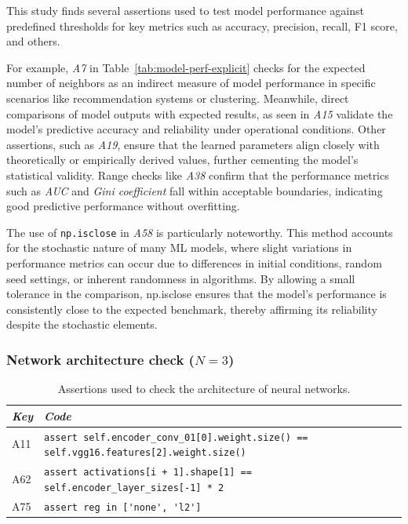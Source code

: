 This study finds several assertions used to test model performance against predefined thresholds for key metrics such as accuracy, precision, recall, F1 score, and others.

For example, \emph{A7} in Table~\ref{tab:model-perf-explicit} checks for the expected number of neighbors as an indirect measure of model performance in specific scenarios like recommendation systems or clustering. Meanwhile, direct comparisons of model outputs with expected results, as seen in \emph{A15} validate the model's predictive accuracy and reliability under operational conditions. Other assertions, such as \emph{A19}, ensure that the learned parameters align closely with theoretically or empirically derived values, further cementing the model’s statistical validity. Range checks like \emph{A38} confirm that the performance metrics such as \emph{AUC} and \emph{Gini coefficient} fall within acceptable boundaries, indicating good predictive performance without overfitting.

The use of \texttt{np.isclose} in \emph{A58} is particularly noteworthy. This method accounts for the stochastic nature of many ML models, where slight variations in performance metrics can occur due to differences in initial conditions, random seed settings, or inherent randomness in algorithms. By allowing a small tolerance in the comparison, np.isclose ensures that the model's performance is consistently close to the expected benchmark, thereby affirming its reliability despite the stochastic elements.


\subsubsection{Network architecture check ($N = 3$)}

\begin{table}
  \centering
  \caption{Assertions used to check the architecture of neural networks.}
  \begin{tabular}{@{}m{} m{}@{}}
    \toprule
    \emph{\textbf{Key}}&
    \emph{\textbf{Code}}\\
    \midrule

    A11 &
    \lstinline[]$assert self.encoder_conv_01[0].weight.size() == self.vgg16.features[2].weight.size()$\\

    A62 &
    \lstinline[]$assert activations[i + 1].shape[1] == self.encoder_layer_sizes[-1] * 2$\\
    
    A75 &
    \lstinline[]$assert reg in ['none', 'l2']$\\
    \bottomrule
  \end{tabular}
  \label{tab:assert-network-architecture}
\end{table}

